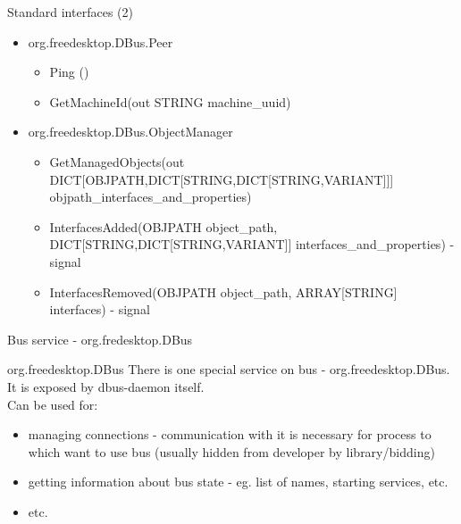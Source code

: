 \documentclass{beamer}
\begin{document}
\begin{frame}{Standard interfaces (2)}
  \begin{itemize}
  \item org.freedesktop.DBus.Peer
    \begin{itemize}
      \item Ping ()
      \item GetMachineId(out STRING machine\_uuid)
    \end{itemize}
  \item org.freedesktop.DBus.ObjectManager    
    \begin{itemize}
      \item GetManagedObjects(out DICT[OBJPATH,DICT[STRING,DICT[STRING,VARIANT]]] objpath\_interfaces\_and\_properties)
      \item InterfacesAdded(OBJPATH object\_path, DICT[STRING,DICT[STRING,VARIANT]] interfaces\_and\_properties) - signal
      \item InterfacesRemoved(OBJPATH object\_path, ARRAY[STRING] interfaces) - signal                                                
    \end{itemize}    
  \end{itemize}
\end{frame}

\begin{frame}{Bus service - org.fredesktop.DBus}
  \begin{block}{org.freedesktop.DBus}
  There is one special service on bus - org.freedesktop.DBus.\\
  It is exposed by dbus-daemon itself.\\Can be used for:\\
  \begin{itemize}
    \item managing connections - communication with it is necessary for process to which want to use bus (usually hidden from developer by library/bidding)
    \item getting information about bus state - eg. list of names, starting services, etc.
    \item etc.
  \end{itemize}
  \end{block}
\end{frame}
\end{document}
